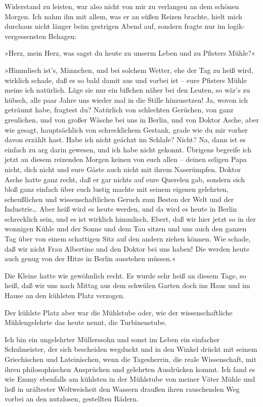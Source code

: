 Widerstand zu leisten, war also nicht von mir zu verlangen an dem
schönen Morgen. Ich nahm ihn mit allem, was er an süßen Reizen
brachte, hielt mich durchaus nicht länger beim gestrigen Abend auf,
sondern fragte nur im logik-vergessensten Behagen:

»Herz, mein Herz, was sagst du heute zu unserm Leben und zu
Pfisters Mühle?«

»Himmlisch ist's, Männchen, und bei solchem Wetter, ehe der Tag zu
heiß wird, wirklich schade, daß es so bald damit aus und vorbei ist
– eure Pfisters Mühle meine ich natürlich. Läge sie nur ein bißchen
näher bei den Leuten, so wär's zu hübsch, alle paar Jahre uns
wieder mal in die Stille hinzusetzen! Ja, wovon ich geträumt habe,
fragtest du? Natürlich von schlechten Gerüchen, von ganz
greulichen, und von großer Wäsche bei uns in Berlin, und von Doktor
Asche, aber wie gesagt, hauptsächlich von schrecklichem Gestank,
grade wie du mir vorher davon erzählt hast. Habe ich nicht geächzt
im Schlafe? Nicht? Na, dann ist es einfach zu arg darin gewesen,
und ich habe nicht gekonnt. Übrigens begreife ich jetzt an diesem
reizenden Morgen keinen von euch allen – deinen seligen Papa nicht,
dich nicht und eure Gäste auch nicht mit ihrem Naserümpfen. Doktor
Asche hatte ganz recht, daß er gar nichts auf eure Querelen gab,
sondern sich bloß ganz einfach über euch lustig machte mit seinem
eigenen gelehrten, scheußlichen und wissenschaftlichen Geruch zum
Besten der Welt und der Industrie\ldots{} Aber heiß wird es heute
werden, und da wird es heute in Berlin schrecklich sein, und es ist
wirklich himmlisch, Ebert, daß wir hier jetzt so in der wonnigen
Kühle und der Sonne und dem Tau sitzen und uns auch den ganzen Tag
über von einem schattigen Sitz auf den andern ziehen können. Wie
schade, daß wir nicht Frau Albertine und den Doktor bei uns haben!
Die werden heute auch genug von der Hitze in Berlin ausstehen
müssen.«

Die Kleine hatte wie gewöhnlich recht. Es wurde sehr heiß an diesem
Tage, so heiß, daß wir uns nach Mittag aus dem schwülen Garten doch
ins Haus und im Hause an den kühlsten Platz verzogen.

Der kühlste Platz aber war die Mühlstube oder, wie der
wissenschaftliche Mühlengelehrte das heute nennt, die
Turbinenstube.

Ich bin ein ungelehrter Müllerssohn und sonst im Leben ein
einfacher Schulmeister, der sich bescheiden wegduckt und in den
Winkel drückt mit seinem Griechischen und Lateinischen, wenn die
Tagesherrin, die reale Wissenschaft, mit ihren philosophischen
Ansprüchen und gelehrten Ausdrücken kommt. Ich fand es wie Emmy
ebenfalls am kühlsten in der Mühlstube von meiner Väter Mühle und
ließ in urältester Weltweisheit den Wassern draußen ihren
rauschenden Weg vorbei an den nutzlosen, gestellten Rädern.

